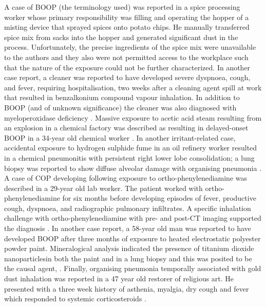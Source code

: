 \documentclass[a4
er,12pt]{article}
\begin{document}
A case of BOOP (the terminology used) was reported in a spice processing worker \cite{Alleman2002} whose primary responsibility was filling and operating the hopper of a misting device that sprayed spices onto potato chips. He manually transferred spice mix from sacks into the hopper and generated significant dust in the process. Unfortunately, the precise ingredients of the spice mix were unavailable to the authors and they also were not permitted access to the workplace such that the nature of the exposure could not be further characterized.  In another case report, a cleaner was reported to have developed severe dyspnoea, cough, and fever, requiring hospitalisation, two weeks after a cleaning agent spill at work that resulted in benzalkonium compound vapour inhalation. In addition to BOOP (and of unknown significance) the cleaner was also diagnosed with myeloperoxidase deficiency \cite{Stefano2003}. Massive exposure to acetic acid steam resulting from an explosion in a chemical factory was described as resulting in delayed-onset BOOP in a 34-year old chemical worker \cite{Sheu2008}. In another irritant-related case, accidental exposure to hydrogen sulphide fume in an oil refinery worker resulted in a chemical pneumonitis with persistent right lower lobe consolidation; a lung biopsy was reported to show diffuse alveolar damage with organising pneumonia \cite{Doujaiji2010}. A case of COP developing following exposure to ortho-phenylenediamine was described in a 29-year old lab worker. The patient worked with ortho-phenylenediamine for six months before developing episodes of fever, productive cough, dyspnoea, and radiographic pulmonary infiltrates. A specific inhalation challenge with ortho-phenylenediamine with pre- and post-CT imaging supported the diagnosis \cite{Sanchez-Ortiz2011}. In another case report, a 58-year old man was reported to have developed BOOP after three months of exposure to heated electrostatic polyester powder paint. Mineralogical analysis indicated the presence of titanium dioxide nanoparticlesin both the paint and in a lung biopsy and this was posited to be the causal agent,  \cite{Cheng2012}. Finally, organising pneumonia temporally associated with gold dust inhalation was reported in a 47 year old restorer of religious art. He presented with a three week history of asthenia, myalgia, dry cough and fever which responded to systemic corticosteroids \cite{Ribeiro2011}.
\end{document}
